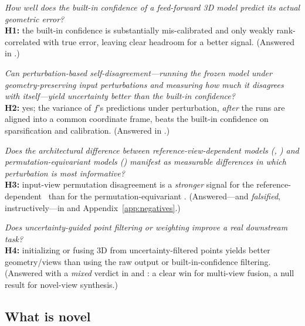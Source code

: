 \begin{description}[leftmargin=1.4em,itemsep=3pt,topsep=3pt]
\item[RQ1 (quality of the status quo).] \emph{How well does the built-in confidence of a feed-forward
3D model predict its actual geometric error?}\\
\textbf{H1:} the built-in confidence is substantially mis-calibrated and only weakly rank-correlated
with true error, leaving clear headroom for a better signal. (Answered in .)

\item[RQ2 (a training-free estimator).] \emph{Can perturbation-based self-disagreement---running the
frozen model under geometry-preserving input perturbations and measuring how much it disagrees with
itself---yield uncertainty better than the built-in confidence?}\\
\textbf{H2:} yes; the variance of $f$'s predictions under perturbation, \emph{after} the runs are
aligned into a common coordinate frame, beats the built-in confidence on sparsification and
calibration. (Answered in .)

\item[RQ3 (architecture and uncertainty).] \emph{Does the architectural difference between
reference-view-dependent models (\vggt, \mastr) and permutation-equivariant models (\pii) manifest
as measurable differences in which perturbation is most informative?}\\
\textbf{H3:} input-view permutation disagreement is a \emph{stronger} signal for the
reference-dependent \vggt\ than for the permutation-equivariant \pii. (Answered---and
\emph{falsified}, instructively---in  and Appendix~\ref{app:negatives}.)

\item[RQ4 (downstream utility).] \emph{Does uncertainty-guided point filtering or weighting improve a
real downstream task?}\\
\textbf{H4:} initializing or fusing 3D from uncertainty-filtered points yields better geometry/views
than using the raw output or built-in-confidence filtering. (Answered with a \emph{mixed} verdict in
 and : a clear win for multi-view fusion, a null result for
novel-view synthesis.)
\end{description}

\subsection{What is novel}
\label{sec:novelty}

